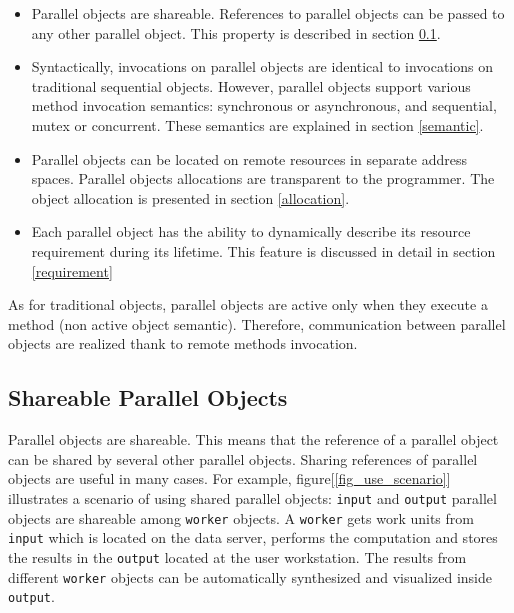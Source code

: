 \begin{itemize}

\item Parallel objects are shareable. References to parallel objects can
       be passed to any other parallel object. This property is described in section \ref{shareable}.

\item Syntactically, invocations on parallel objects are identical to
       invocations on traditional sequential objects. However, parallel
       objects support various method invocation semantics: synchronous
       or asynchronous, and sequential, mutex or concurrent. These
       semantics are explained in section \ref{semantic}.

\item Parallel objects can be located on remote resources in separate
       address spaces. Parallel objects allocations are transparent to
       the programmer. The object allocation is presented in section
       \ref{allocation}.

\item Each parallel object has the ability to dynamically describe its
       resource requirement during its lifetime. This feature is
       discussed in detail in section \ref{requirement}

\end{itemize}

As for traditional objects, parallel objects are active only when they execute
a method (non active object semantic). Therefore, communication between
parallel objects are realized thank to remote methods invocation.


\pagebreak
\subsection{Shareable Parallel Objects}
\label{shareable}
Parallel objects are shareable. This means that the reference of a
parallel object can be shared by several other parallel objects.
Sharing references of parallel objects are useful in many cases.
For example, figure[\ref{fig_use_scenario}] illustrates a scenario of
using shared parallel objects: \texttt{input} and \texttt{output}
parallel objects are shareable among \texttt{worker} objects.
A \texttt{worker} gets work
units from \texttt{input} which is located on the data server, performs
the computation and stores the results in the \texttt{output} located at
the user workstation. The results from different \texttt{worker} objects
can be automatically synthesized and visualized inside \texttt{output}.


